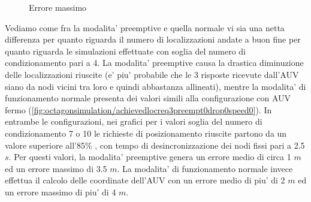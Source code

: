 \documentclass[Lau,binding=0.6cm]{sapthesis}
\begin{document}
\begin{figure}[H]
    \centering
    \hfill
    \caption{Errore massimo}
\end{figure}
Vediamo come fra la modalita' preemptive e quella normale vi sia una netta differenza per quanto riguarda il numero di localizzazioni andate a buon fine per quanto riguarda le simulazioni effettuate con soglia del numero di condizionamento pari a 4. La modalita' preemptive causa la drastica diminuzione delle localizzazioni riuscite (e' piu' probabile che le 3 risposte ricevute dall'AUV siano da nodi vicini tra loro e quindi abbastanza allineati), mentre la modalita' di funzionamento normale presenta dei valori simili alla configurazione con AUV fermo (\ref{fig:octagonsimulation/achievedlocreq3preempt0drop0speed0}).
In entrambe le configurazioni, nei grafici per i valori soglia del numero di condizionamento 7 o 10 le richieste di posizionamento riuscite partono da un valore superiore all'85\% , con tempo di desincronizzazione dei nodi fissi pari a 2.5 $s$.
Per questi valori, la modalita' preemptive genera un errore medio di circa 1 $m$ ed un errore massimo di 3.5 $m$. La modalita' di funzionamento normale invece effettua il calcolo delle coordinate dell'AUV con un errore medio di piu' di 2 $m$ ed un errore massimo di piu' di 4 $m$.
\end{document}
